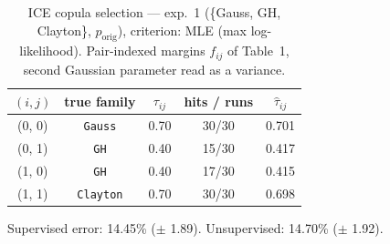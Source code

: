 \begin{table}[htbp]
  \centering
  \caption{ICE copula selection — exp.\ 1 (\{Gauss, GH, Clayton\}, $p_{\text{orig}}$), criterion: MLE (max log-likelihood). Pair-indexed margins $f_{ij}$ of Table~1, second Gaussian parameter read as a variance.}
  \label{tab:exp3-exp1_orig_p__mle}
  \begin{tabular}{ccccc}
    \toprule
    $(i, j)$ & true family & $\tau_{ij}$ & hits / runs & $\hat\tau_{ij}$ \\
    \midrule
    (0, 0) & \texttt{Gauss} & 0.70 & 30/30 & 0.701 \\
    (0, 1) & \texttt{GH} & 0.40 & 15/30 & 0.417 \\
    (1, 0) & \texttt{GH} & 0.40 & 17/30 & 0.415 \\
    (1, 1) & \texttt{Clayton} & 0.70 & 30/30 & 0.698 \\
    \bottomrule
  \end{tabular}
  \par\smallskip Supervised error: 14.45\% ($\pm$ 1.89). Unsupervised: 14.70\% ($\pm$ 1.92).
\end{table}
